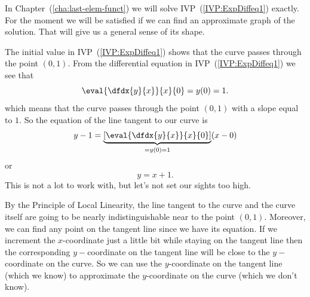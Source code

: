 

In Chapter~(\ref{cha:last-elem-funct}) we will solve
IVP~(\ref{IVP:ExpDiffeq1}) exactly. For the moment we will be
satisfied if we can find an approximate graph of the solution.  That
will give us a general sense of its shape.


The initial value in IVP~(\ref{IVP:ExpDiffeq1}) shows that  the curve
passes through the point $(0,1)$.  From the differential equation in
IVP~(\ref{IVP:ExpDiffeq1})  we see that
$$
\eval{\dfdx{y}{x}}{x}{0} = y(0) =1.
$$
which means that the curve passes through the point $(0,1)$ with a
slope equal to $1$.  So the equation of the line
tangent to our curve is
$$
y-1=\underbrace{\left[\eval{\dfdx{y}{x}}{x}{0}\right]}_{=y(0)=1}(x-0)
$$
or
$$
y=x+1.
$$
This is not a lot to work with, but let's not set our sights too high.

By the Principle of Local Linearity, the line tangent to the curve and
the curve itself are going to be nearly indistinguishable near to the
point $(0,1)$. Moreover, we can find any point on the tangent line
since we have its equation.  If we increment the $x$-coordinate just a
little bit while staying on the tangent line then the corresponding
$y-$coordinate on the tangent line will be close to the $y-$coordinate
on the curve. So we can use the $y$-coordinate on the tangent line
(which we know) to approximate the $y$-coordinate on the curve (which
we don't know).

